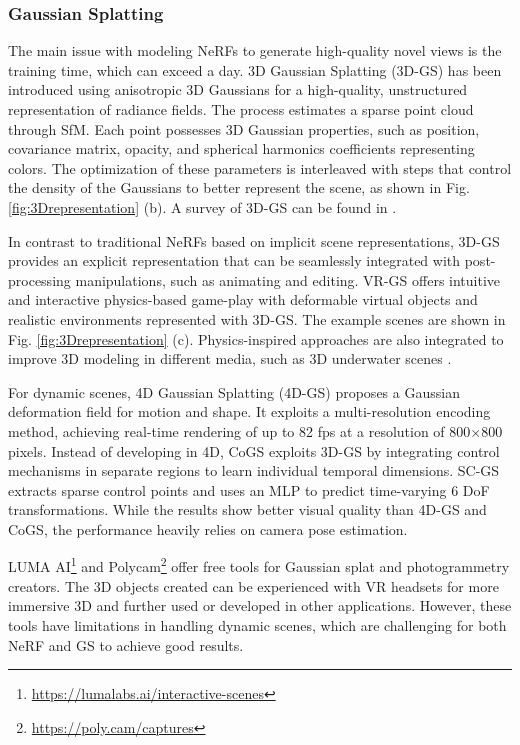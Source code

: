 \documentclass[11pt,a4paper]{article}
\begin{document}
\subsubsection{Gaussian Splatting}
\label{sssec:3DGS}

The main issue with modeling NeRFs to generate high-quality novel views is the training time, which can exceed a day. 3D Gaussian Splatting (3D-GS) \cite{kerbl:3Dgaussians:2023} has been introduced using anisotropic 3D Gaussians for a high-quality, unstructured representation of radiance fields. The process estimates a sparse point cloud through SfM. Each point possesses 3D Gaussian properties, such as position, covariance matrix, opacity, and spherical harmonics coefficients representing colors. The optimization of these parameters is interleaved with steps that control the density of the Gaussians to better represent the scene, as shown in Fig. \ref{fig:3Drepresentation} (b). A survey of 3D-GS can be found in \cite{10521791}.

In contrast to traditional NeRFs based on implicit scene representations, 3D-GS provides an explicit representation that can be seamlessly integrated with post-processing manipulations, such as animating and editing. VR-GS \cite{jiang:vrgs:2024} offers intuitive and interactive physics-based game-play with deformable virtual objects and realistic environments represented with 3D-GS. The example scenes are shown in Fig. \ref{fig:3Drepresentation} (c). Physics-inspired approaches are also integrated to improve 3D modeling in different media, such as 3D underwater scenes \cite{Wang2025}.

For dynamic scenes, 4D Gaussian Splatting (4D-GS) \cite{wu:4dgaussians:2024} proposes a Gaussian deformation field for motion and shape. It exploits a multi-resolution encoding method, achieving real-time rendering of up to 82 fps at a resolution of 800$\times$800 pixels. Instead of developing in 4D, CoGS \cite{Yu:CoGS:2024} exploits 3D-GS by integrating control mechanisms in separate regions to learn individual temporal dimensions. SC-GS \cite{Huang:SCGS:2024} extracts sparse control points and uses an MLP to predict time-varying 6 DoF transformations. While the results show better visual quality than 4D-GS and CoGS, the performance heavily relies on camera pose estimation. 

LUMA AI\footnote{\url{https://lumalabs.ai/interactive-scenes}} and 
Polycam\footnote{\url{https://poly.cam/captures}} offer free tools for Gaussian splat and photogrammetry creators. The 3D objects created can be experienced with VR headsets for more immersive 3D and further used or developed in other applications. However, these tools have limitations in handling dynamic scenes, which are challenging for both NeRF and GS to achieve good results.
\end{document}
